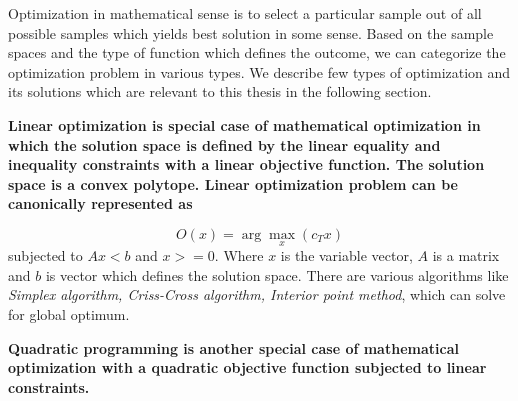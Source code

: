
Optimization in mathematical sense is to select a particular sample out of all 
possible samples which yields best solution in some sense. Based on the sample
spaces and the type of function which defines the outcome, we can categorize the
optimization problem in various types. We describe few types of optimization and 
its solutions which are relevant to this thesis in the following section.

\bf{Linear optimization} is special case of mathematical optimization in which the
solution space is defined by the linear equality and inequality constraints with
a linear objective function. The solution space is a convex polytope. Linear
optimization problem can be canonically represented as

\begin{equation}
O(x) = \arg\max_x(c_Tx)
\end{equation}
subjected to $Ax < b$ and $x>=0$. Where $x$ is the variable vector, $A$ is a
matrix and $b$ is vector which defines the solution space. There are various
algorithms like \textit{Simplex algorithm, Criss-Cross algorithm, Interior 
point method}, which can solve for global optimum.

\bf{Quadratic programming} is another special case of mathematical optimization
with a quadratic objective function subjected to linear constraints.
